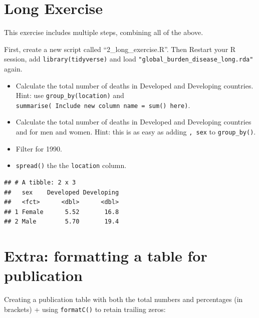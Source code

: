 \documentclass[]{book}
\providecommand{\tightlist}{%
  \setlength{\itemsep}{0pt}\setlength{\parskip}{0pt}}
\theoremstyle{definition}
\theoremstyle{definition}
\theoremstyle{definition}
\theoremstyle{remark}
\begin{document}
\newpage

\hypertarget{long-exercise}{%
\section{Long Exercise}\label{long-exercise}}

This exercise includes multiple steps, combining all of the above.

First, create a new script called ``2\_long\_exercise.R''. Then Restart
your R session, add \texttt{library(tidyverse)} and load
\texttt{"global\_burden\_disease\_long.rda"} again.

\begin{itemize}
\tightlist
\item
  Calculate the total number of deaths in Developed and Developing
  countries. Hint: use \texttt{group\_by(location)} and
  \texttt{summarise(\ Include\ new\ column\ name\ =\ sum()\ here)}.
\item
  Calculate the total number of deaths in Developed and Developing
  countries and for men and women. Hint: this is as easy as adding
  \texttt{,\ sex} to \texttt{group\_by()}.
\item
  Filter for 1990.
\item
  \texttt{spread()} the the \texttt{location} column.
\end{itemize}

\begin{verbatim}
## # A tibble: 2 x 3
##   sex    Developed Developing
##   <fct>      <dbl>      <dbl>
## 1 Female      5.52       16.8
## 2 Male        5.70       19.4
\end{verbatim}

\hypertarget{extra-formatting-a-table-for-publication}{%
\section{Extra: formatting a table for
publication}\label{extra-formatting-a-table-for-publication}}

Creating a publication table with both the total numbers and percentages
(in brackets) + using \texttt{formatC()} to retain trailing zeros:
\end{document}
